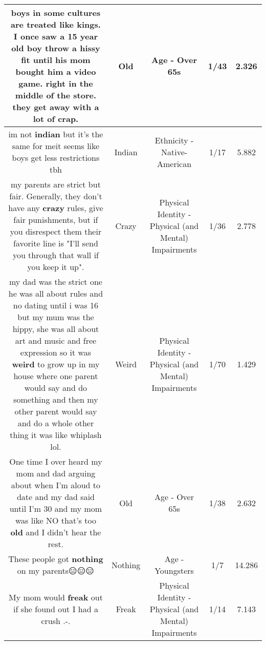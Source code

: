 \documentclass[11pt]{article}
\newlength\mylength
\begin{document}
\begin{center}
\begin{longtable}{|C{.65\mylength}|C{.30\mylength}|C{.12\mylength}|C{.12\mylength}|C{.12\mylength}|}
  \small boys in some cultures are treated like kings. I once saw a 15 year \textbf{old} boy throw a hissy fit until his mom bought him a video game. right in the middle of the store. they get away with a lot of crap.\normalsize   & Old & Age - Over 65s & 1/43 & 2.326 \\  \hline
  \small im not \textbf{indian} but it's the same for meit seems like boys get less restrictions tbh\normalsize   & Indian & Ethnicity - Native-American & 1/17 & 5.882 \\  \hline
  \small my parents are strict but fair.  Generally, they don't have any \textbf{crazy} rules, give fair punishments, but if you disrespect them their favorite line is "I'll send you through that wall if you keep it up".\normalsize   & Crazy & Physical Identity - Physical (and Mental) Impairments & 1/36 & 2.778 \\  \hline
  \small my dad was the strict one he was all about rules and no dating until i was 16 but my mum was the hippy, she was all about art and music and free expression so it was \textbf{weird} to grow up in my house where one parent would say and do something and then my other parent would say and do a whole other thing it was like whiplash lol.\normalsize   & Weird & Physical Identity - Physical (and Mental) Impairments & 1/70 & 1.429 \\  \hline
  \small One time I over heard my mom and dad arguing about when I'm aloud to date and my dad said until I'm 30 and my mom was like NO that's too \textbf{old} and I didn't hear the rest.\normalsize   & Old & Age - Over 65s & 1/38 & 2.632 \\  \hline
  \small These people got \textbf{nothing} on my parents😑😑😑\normalsize   & Nothing & Age - Youngsters & 1/7 & 14.286 \\  \hline
  \small My mom would \textbf{freak} out if she found out I had a crush .-.\normalsize   & Freak & Physical Identity - Physical (and Mental) Impairments & 1/14 & 7.143 \\  \hline

\end{longtable}
\end{center}
\end{document}
